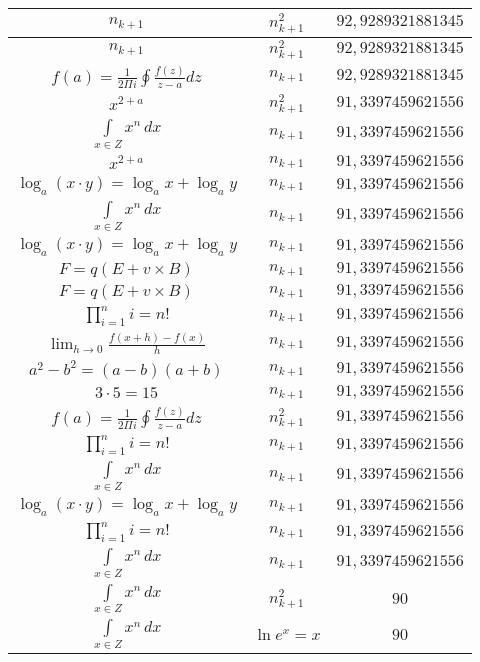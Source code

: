 \documentclass{article}
\begin{document}
\begin{flushleft}
\begin{longtable}{|c|c|c|}
$n_{k+1}$ & $n_{k+1}^2$ & $92,9289321881345$ \\ \hline 
$n_{k+1}$ & $n_{k+1}^2$ & $92,9289321881345$ \\ \hline 
$f\left(a\right)=\frac{1}{2\Pi i}\oint\frac{f\left(z\right)}{z-a}dz$ & $n_{k+1}$ & $92,9289321881345$ \\ \hline 
$x^{2+a}$ & $n_{k+1}^2$ & $91,3397459621556$ \\ \hline 
$\int \limits_{x\in Z}\!x^{n}\,dx$ & $n_{k+1}$ & $91,3397459621556$ \\ \hline 
$x^{2+a}$ & $n_{k+1}$ & $91,3397459621556$ \\ \hline 
$\log_{a}(x\cdot y)=\log_{a}x+\log_{a}y$ & $n_{k+1}$ & $91,3397459621556$ \\ \hline 
$\int \limits_{x\in Z}\!x^{n}\,dx$ & $n_{k+1}$ & $91,3397459621556$ \\ \hline 
$\log_{a}(x\cdot y)=\log_{a}x+\log_{a}y$ & $n_{k+1}$ & $91,3397459621556$ \\ \hline 
$F=q\left(E+v\times B\right)$ & $n_{k+1}$ & $91,3397459621556$ \\ \hline 
$F=q\left(E+v\times B\right)$ & $n_{k+1}$ & $91,3397459621556$ \\ \hline 
$\prod_{i=1}^ni=n!$ & $n_{k+1}$ & $91,3397459621556$ \\ \hline 
$\lim_{h\to0}\frac{f(x+h)-f(x)}{h}$ & $n_{k+1}$ & $91,3397459621556$ \\ \hline 
$a^2-b^2=(a-b)(a+b)$ & $n_{k+1}$ & $91,3397459621556$ \\ \hline 
$3\cdot 5=15$ & $n_{k+1}$ & $91,3397459621556$ \\ \hline 
$f\left(a\right)=\frac{1}{2\Pi i}\oint\frac{f\left(z\right)}{z-a}dz$ & $n_{k+1}^2$ & $91,3397459621556$ \\ \hline 
$\prod_{i=1}^ni=n!$ & $n_{k+1}$ & $91,3397459621556$ \\ \hline 
$\int \limits_{x\in Z}\!x^{n}\,dx$ & $n_{k+1}$ & $91,3397459621556$ \\ \hline 
$\log_{a}(x\cdot y)=\log_{a}x+\log_{a}y$ & $n_{k+1}$ & $91,3397459621556$ \\ \hline 
$\prod_{i=1}^ni=n!$ & $n_{k+1}$ & $91,3397459621556$ \\ \hline 
$\int \limits_{x\in Z}\!x^{n}\,dx$ & $n_{k+1}$ & $91,3397459621556$ \\ \hline 
$\int \limits_{x\in Z}\!x^{n}\,dx$ & $n_{k+1}^2$ & $90$ \\ \hline 
$\int \limits_{x\in Z}\!x^{n}\,dx$ & $\ln e^x=x$ & $90$ \\ \hline 

\end{longtable}
\end{flushleft}
\end{document}
